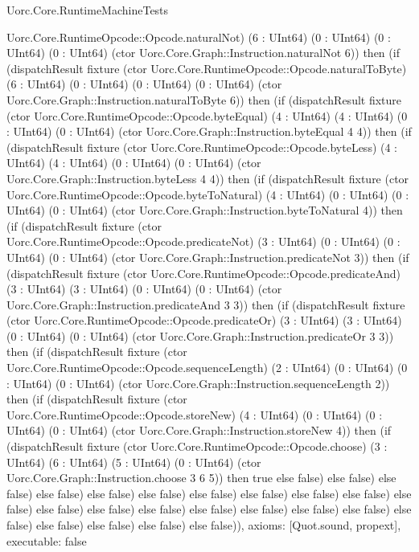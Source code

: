 \begin{lexlean}{Uorc.Core.RuntimeMachineTests}
\begin{semanticmodule}
{Uorc.Core.RuntimeOpcode::Opcode.naturalNot) (6 : UInt64) (0 : UInt64) (0 : UInt64) (0 : UInt64) (ctor Uorc.Core.Graph::Instruction.naturalNot 6)) then (if (dispatchResult fixture (ctor Uorc.Core.RuntimeOpcode::Opcode.naturalToByte) (6 : UInt64) (0 : UInt64) (0 : UInt64) (0 : UInt64) (ctor Uorc.Core.Graph::Instruction.naturalToByte 6)) then (if (dispatchResult fixture (ctor Uorc.Core.RuntimeOpcode::Opcode.byteEqual) (4 : UInt64) (4 : UInt64) (0 : UInt64) (0 : UInt64) (ctor Uorc.Core.Graph::Instruction.byteEqual 4 4)) then (if (dispatchResult fixture (ctor Uorc.Core.RuntimeOpcode::Opcode.byteLess) (4 : UInt64) (4 : UInt64) (0 : UInt64) (0 : UInt64) (ctor Uorc.Core.Graph::Instruction.byteLess 4 4)) then (if (dispatchResult fixture (ctor Uorc.Core.RuntimeOpcode::Opcode.byteToNatural) (4 : UInt64) (0 : UInt64) (0 : UInt64) (0 : UInt64) (ctor Uorc.Core.Graph::Instruction.byteToNatural 4)) then (if (dispatchResult fixture (ctor Uorc.Core.RuntimeOpcode::Opcode.predicateNot) (3 : UInt64) (0 : UInt64) (0 : UInt64) (0 : UInt64) (ctor Uorc.Core.Graph::Instruction.predicateNot 3)) then (if (dispatchResult fixture (ctor Uorc.Core.RuntimeOpcode::Opcode.predicateAnd) (3 : UInt64) (3 : UInt64) (0 : UInt64) (0 : UInt64) (ctor Uorc.Core.Graph::Instruction.predicateAnd 3 3)) then (if (dispatchResult fixture (ctor Uorc.Core.RuntimeOpcode::Opcode.predicateOr) (3 : UInt64) (3 : UInt64) (0 : UInt64) (0 : UInt64) (ctor Uorc.Core.Graph::Instruction.predicateOr 3 3)) then (if (dispatchResult fixture (ctor Uorc.Core.RuntimeOpcode::Opcode.sequenceLength) (2 : UInt64) (0 : UInt64) (0 : UInt64) (0 : UInt64) (ctor Uorc.Core.Graph::Instruction.sequenceLength 2)) then (if (dispatchResult fixture (ctor Uorc.Core.RuntimeOpcode::Opcode.storeNew) (4 : UInt64) (0 : UInt64) (0 : UInt64) (0 : UInt64) (ctor Uorc.Core.Graph::Instruction.storeNew 4)) then (if (dispatchResult fixture (ctor Uorc.Core.RuntimeOpcode::Opcode.choose) (3 : UInt64) (6 : UInt64) (5 : UInt64) (0 : UInt64) (ctor Uorc.Core.Graph::Instruction.choose 3 6 5)) then true else false) else false) else false) else false) else false) else false) else false) else false) else false) else false) else false) else false) else false) else false) else false) else false) else false) else false) else false) else false) else false) else false) else false)),
  axioms: [Quot.sound, propext],
  executable: false
}


\end{semanticmodule}
\end{lexlean}
